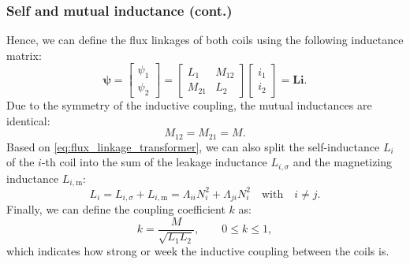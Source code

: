 \begin{frame}
	\frametitle{Self and mutual inductance (cont.)}
    Hence, we can define the flux linkages of both coils using the following inductance matrix:
    \begin{equation}
        \bm{\psi} = \begin{bmatrix} \psi_1 \\ \psi_2 \end{bmatrix} = \begin{bmatrix} L_1 & M_{12} \\ M_{21} & L_2 \end{bmatrix} \begin{bmatrix} i_1 \\ i_2 \end{bmatrix} = \bm{L}\bm{i}.
    \end{equation}
    \pause
    Due to the symmetry of the inductive coupling, the mutual inductances are identical:
    \begin{equation}
        M_{12} = M_{21} = M.
    \end{equation}
    \pause
    Based on \eqref{eq:flux_linkage_transformer}, we can also split the self-inductance $L_i$ of the $i$-th coil into the sum of the leakage inductance $L_{i,\sigma}$ and the magnetizing inductance $L_{i,\mathrm{m}}$:
    \begin{equation}
        L_i = L_{i,\sigma} + L_{i,\mathrm{m}} = \Lambda_{ii}N_i^2 + \Lambda_{ji}N_i^2 \quad \mbox{with} \quad i \neq j. 
    \end{equation}
    \pause
    Finally, we can define the coupling coefficient $k$ as:
    \begin{equation}
        k = \frac{M}{\sqrt{L_1 L_2}}, \qquad 0 \leq k \leq 1,
    \end{equation}
    which indicates how strong or week the inductive coupling between the coils is.
\end{frame}

